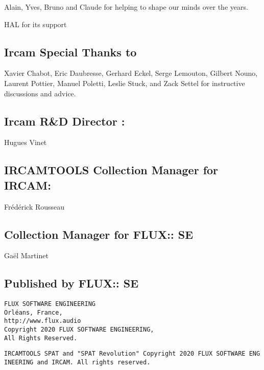 \documentclass[
  letterpaper,
  DIV=11,
  numbers=noendperiod]{scrreport}
\begin{document}
Alain, Yves, Bruno and Claude for helping to shape our minds over the
years.

HAL for its support

\hypertarget{ircam-special-thanks-to}{%
\subsection{Ircam Special Thanks to}\label{ircam-special-thanks-to}}

Xavier Chabot, Eric Daubresse, Gerhard Eckel, Serge Lemouton, Gilbert
Nouno, Laurent Pottier, Manuel Poletti, Leslie Stuck, and Zack Settel
for instructive discussions and advice.

\hypertarget{ircam-rd-director}{%
\subsection{Ircam R\&D Director :}\label{ircam-rd-director}}

Hugues Vinet

\hypertarget{ircamtools-collection-manager-for-ircam}{%
\subsection{IRCAMTOOLS Collection Manager for
IRCAM:}\label{ircamtools-collection-manager-for-ircam}}

Frédérick Rousseau

\hypertarget{collection-manager-for-flux-se}{%
\subsection{Collection Manager for FLUX::
SE}\label{collection-manager-for-flux-se}}

Gaël Martinet

\hypertarget{published-by-flux-se}{%
\subsection{Published by FLUX:: SE}\label{published-by-flux-se}}

\begin{verbatim}
FLUX SOFTWARE ENGINEERING
Orléans, France,
http://www.flux.audio
Copyright 2020 FLUX SOFTWARE ENGINEERING,
All Rights Reserved.
\end{verbatim}

\texttt{IRCAMTOOLS\ SPAT\ and\ "SPAT\ Revolution"\ Copyright\ 2020\ FLUX\ SOFTWARE\ ENGINEERING\ and\ IRCAM.\ All\ rights\ reserved.}
\end{document}
